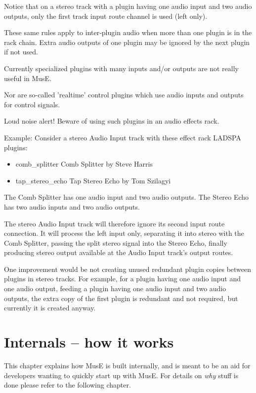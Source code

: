 \documentclass[a4paper]{report}
\begin{document}
Notice that on a stereo track with a plugin having one audio input and
two audio outputs, only the first track input route channel is used
(left only).
 
These same rules apply to inter-plugin audio when more than one plugin 
is in the rack chain. Extra audio outputs of one plugin may be ignored
by the next plugin if not used. 
 
Currently specialized plugins with many inputs and/or outputs are not 
really useful in MusE.

Nor are so-called 'realtime' control plugins which use audio inputs 
and outputs for control signals. 

Loud noise alert! Beware of using such plugins in an audio effects
rack. 

Example: Consider a stereo Audio Input track with these effect rack 
 LADSPA plugins: 
 
\begin{itemize}
\item comb\_splitter Comb Splitter by Steve Harris
\item tap\_stereo\_echo Tap Stereo Echo by Tom Szilagyi
\end{itemize}
    

The Comb Splitter has one audio input and two audio outputs. 
The Stereo Echo has two audio inputs and two audio outputs.
  
The stereo Audio Input track will therefore ignore its second
input route connection. It will process the left input only,
separating it into stereo with the Comb Splitter, passing the  
split stereo signal into the Stereo Echo, finally producing 
stereo output available at the Audio Input track's output routes.      
  
  
One improvement would be not creating unused redundant plugin copies
between plugins in stereo tracks.
For example, for a plugin having one audio input and one audio output,
feeding a plugin having one audio input and two audio outputs,  
the extra copy of the first plugin is redundant and not required,
but currently it is created anyway.
  

\chapter{Internals -- how it works}
This chapter explains how MusE is built internally, and is meant
to be an aid for developers wanting to quickly start up with MusE.
For details on \emph{why} stuff is done please refer to the following
chapter. 
\end{document}
